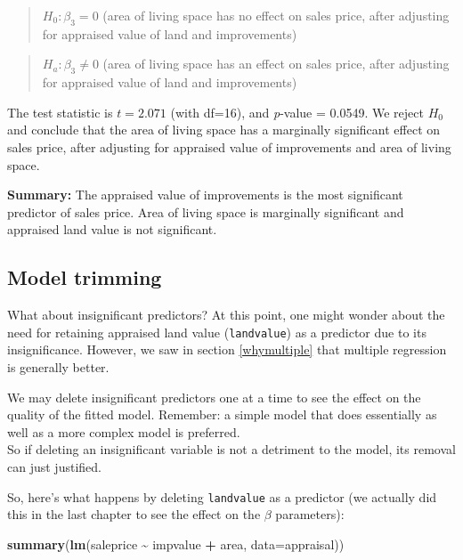 \documentclass[
]{book}
\newenvironment{Shaded}{\begin{snugshade}}{\end{snugshade}}
\newcommand{\AttributeTok}[1]{\textcolor[rgb]{0.13,0.29,0.53}{#1}}
\newcommand{\FunctionTok}[1]{\textcolor[rgb]{0.13,0.29,0.53}{\textbf{#1}}}
\newcommand{\NormalTok}[1]{#1}
\newcommand{\SpecialCharTok}[1]{\textcolor[rgb]{0.81,0.36,0.00}{\textbf{#1}}}
\begin{document}
\begin{quote}
\(H_0: \beta_3 = 0\) (area of living space has no effect on sales price, after adjusting for appraised value of land and improvements)
\end{quote}

\begin{quote}
\(H_a: \beta_3 \neq 0\) (area of living space has an effect on sales price, after adjusting for appraised value of land and improvements)
\end{quote}

The test statistic is \(t = 2.071\) (with df=16), and \emph{p}-value = 0.0549. We reject \(H_0\) and conclude that the area of living space has a marginally significant effect on sales price, after adjusting for appraised value of improvements and area of living space.

\textbf{Summary:} The appraised value of improvements is the most significant predictor of sales price. Area of living space is marginally significant and appraised land value is not significant.

\hypertarget{model-trimming}{%
\subsection{Model trimming}\label{model-trimming}}

What about insignificant predictors?
At this point, one might wonder about the need for retaining appraised land value (\texttt{landvalue}) as a predictor due to its insignificance.
However, we saw in section \ref{whymultiple} that multiple regression is generally better.

We may delete insignificant predictors one at a time to see the effect on the quality of the fitted model.
Remember: a simple model that does essentially as well as a more complex model is preferred.\\
So if deleting an insignificant variable is not a detriment to the model, its removal can just justified.

So, here's what happens by deleting \texttt{landvalue} as a predictor (we actually did this in the last chapter to see the effect on the \(\beta\) parameters):

\begin{Shaded}
\begin{Highlighting}[]
\FunctionTok{summary}\NormalTok{(}\FunctionTok{lm}\NormalTok{(saleprice }\SpecialCharTok{\textasciitilde{}}\NormalTok{ impvalue }\SpecialCharTok{+}\NormalTok{ area, }\AttributeTok{data=}\NormalTok{appraisal))}
\end{Highlighting}
\end{Shaded}
\end{document}
